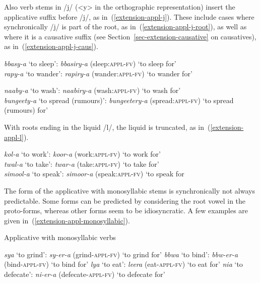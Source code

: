 Also verb stems in /j/ (<y> in the orthographic representation) insert the applicative suffix before /j/, as in~(\ref{extension-appl-j}). 
These include cases where synchronically /j/ is part of the root, as in~(\ref{extension-appl-j-root}), as well as where it is a causative suffix (see Section~\ref{sec-extension-causative} on causatives), as in~(\ref{extension-appl-j-caus}).

\ea \label{extension-appl-j}
\begin{xlist}

\ex \label{extension-appl-j-root}
\textit{bbasy-a}	`to sleep': 	\textit{bbasiry-a} (sleep:\textsc{appl}-\textsc{fv}) `to sleep for'\\
\textit{rapy-a}	`to wander':  	\textit{rapiry-a} (wander:\textsc{appl}-\textsc{fv}) `to wander for'

\ex \label{extension-appl-j-caus}
\textit{naaby-a} `to wash':  	\textit{naabiry-a} (wash:\textsc{appl}-\textsc{fv})  `to wash for'\\
\textit{bungeety-a}	`to spread (rumours)':  	\textit{bungeetery-a} (spread:\textsc{appl}-\textsc{fv})  `to spread (rumours) for'
\end{xlist}
\z

With roots ending in the liquid /l/, the liquid is truncated, as in~(\ref{extension-appl-l}). 

\ea \label{extension-appl-l}
\textit{kol-a}	`to work': 	\textit{koor-a} (work:\textsc{appl}-\textsc{fv}) `to work for'\\ 
\textit{twal-a}	`to take': 	\textit{twar-a} (take:\textsc{appl}-\textsc{fv}) `to take for'\\ 
\textit{simool-a}	`to speak':  	\textit{simoor-a} (speak:\textsc{appl}-\textsc{fv}) `to speak for 
\z

The form of the applicative with monosyllabic stems is synchronically not always predictable. 
Some forms can be predicted by considering the root vowel in the proto-forms, whereas other forms seem to be idiosyncratic. A few examples are given in~(\ref{extension-appl-monosyllabic}). 

\ea \label{extension-appl-monosyllabic}
Applicative with monosyllabic verbs
\begin{xlist}
\ex \textit{sya}	`to grind':  \textit{sy-er-a} (grind-\textsc{appl}-\textsc{fv}) `to grind for'
\ex \textit{bbwa}	`to bind': \textit{bbw-er-a}  (bind-\textsc{appl}-\textsc{fv}) `to bind for'
\ex \textit{lya}	 `to eat': 	\textit{leera} (eat-\textsc{appl}-\textsc{fv}) `to eat for'
\ex \textit{nia}	 `to defecate':	\textit{ni-er-a} (defecate-\textsc{appl}-\textsc{fv}) `to defecate for'
\end{xlist}
\z


